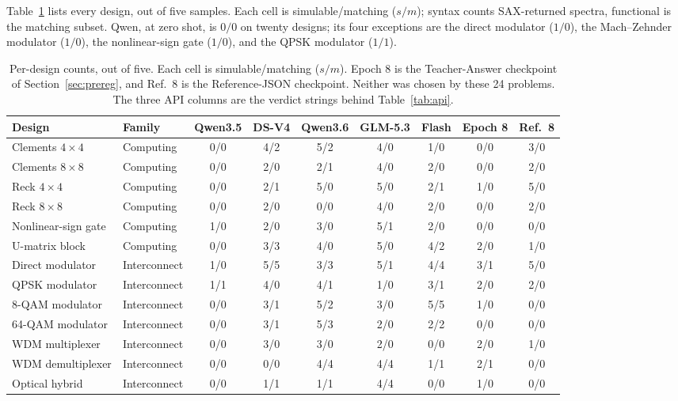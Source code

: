 \documentclass[11pt]{article}
\begin{document}
Table~\ref{tab:perdesign} lists every design, out of five samples.
Each cell is simulable/matching ($s/m$); syntax counts SAX-returned spectra, functional is the matching subset.
Qwen, at zero shot, is $0/0$ on twenty designs; its four exceptions are the direct modulator ($1/0$), the Mach--Zehnder modulator ($1/0$), the nonlinear-sign gate ($1/0$), and the QPSK modulator ($1/1$).\begin{table}[H]
\caption{Per-design counts, out of five.
Each cell is simulable/matching ($s/m$).
Epoch 8 is the Teacher-Answer checkpoint of Section~\ref{sec:prereg}, and Ref.\ 8 is the Reference-JSON checkpoint.
Neither was chosen by these 24 problems.
The three API columns are the verdict strings behind Table~\ref{tab:api}.}
\label{tab:perdesign}
\begin{center}
\begin{small}
\begin{tabular}{llccccccc}
\toprule
Design & Family & Qwen3.5 & DS-V4 & Qwen3.6 & GLM-5.3 & Flash & Epoch 8 & Ref.\ 8 \\
\midrule
Clements $4\times4$ & Computing & 0/0 & 4/2 & 5/2 & 4/0 & 1/0 & 0/0 & 3/0 \\
Clements $8\times8$ & Computing & 0/0 & 2/0 & 2/1 & 4/0 & 2/0 & 0/0 & 2/0 \\
Reck $4\times4$ & Computing & 0/0 & 2/1 & 5/0 & 5/0 & 2/1 & 1/0 & 5/0 \\
Reck $8\times8$ & Computing & 0/0 & 2/0 & 0/0 & 4/0 & 2/0 & 0/0 & 2/0 \\
Nonlinear-sign gate & Computing & 1/0 & 2/0 & 3/0 & 5/1 & 2/0 & 0/0 & 0/0 \\
U-matrix block & Computing & 0/0 & 3/3 & 4/0 & 5/0 & 4/2 & 2/0 & 1/0 \\
\midrule
Direct modulator & Interconnect & 1/0 & 5/5 & 3/3 & 5/1 & 4/4 & 3/1 & 5/0 \\
QPSK modulator & Interconnect & 1/1 & 4/0 & 4/1 & 1/0 & 3/1 & 2/0 & 2/0 \\
8-QAM modulator & Interconnect & 0/0 & 3/1 & 5/2 & 3/0 & 5/5 & 1/0 & 0/0 \\
64-QAM modulator & Interconnect & 0/0 & 3/1 & 5/3 & 2/0 & 2/2 & 0/0 & 0/0 \\
WDM multiplexer & Interconnect & 0/0 & 3/0 & 3/0 & 2/0 & 0/0 & 2/0 & 1/0 \\
WDM demultiplexer & Interconnect & 0/0 & 0/0 & 4/4 & 4/4 & 1/1 & 2/1 & 0/0 \\
Optical hybrid & Interconnect & 0/0 & 1/1 & 1/1 & 4/4 & 0/0 & 1/0 & 0/0 \\

\end{tabular}
\end{small}
\end{center}
\end{table}
\end{document}
